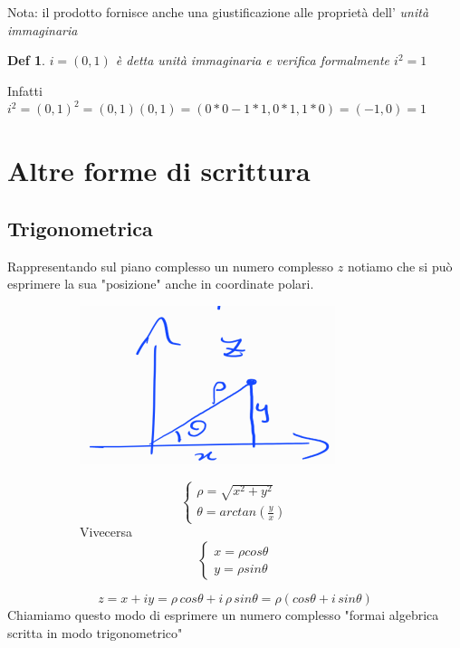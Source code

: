 \documentclass[a4paper]{article}
\newtheorem*{definition}{Def}
\begin{document}
Nota: il prodotto fornisce anche una giustificazione alle proprietà dell' \textit{unità immaginaria}
\begin{definition}
	$i=(0,1)$ è detta \textit{unità immaginaria} e verifica formalmente $i^2 =1$
\end{definition}
Infatti $i^2=(0,1)^2 = (0,1)(0,1) = (0*0 -1*1,0*1, 1 *0) = (-1,0) = 1$

\section{Altre forme di scrittura}
\subsection{Trigonometrica}
Rappresentando sul piano complesso un numero complesso $z$ notiamo che si può esprimere la sua "posizione" anche in coordinate polari.\\
\begin{figure}[H]
	\begin{subfigure}[c]{0.5\textwidth}
	\includegraphics[width=\textwidth]{forma_trig.png}
	\end{subfigure}
	\begin{subfigure}[c]{0.5\textwidth}
		\begin{equation*}
			\begin{cases}
				\rho = \sqrt{x^2 +y^2}\\
				\theta = arctan(\frac{y}{x})
			\end{cases}
		\end{equation*}
		Vivecersa
		\begin{equation*}
			\begin{cases}
				x = \rho cos \theta\\
				y = \rho sin \theta
			\end{cases}
		\end{equation*}
	\end{subfigure}
\end{figure}
$$ z=x + iy = \rho\, cos \theta + i\,\rho \, sin \theta = \rho (cos\theta + i\,sin \theta)$$
Chiamiamo questo modo di esprimere un numero complesso "formai algebrica scritta in modo trigonometrico"
\end{document}

